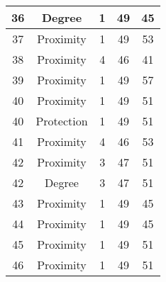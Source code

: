 \documentclass[results.tex]{subfiles}
\begin{document}
\begin{center}
\begin{tabular}{| c || c | c | c | c |}
            \hline
            36                      & Degree                       & 1                      & 49                      & 45                   \\
            \hline
            37                      & Proximity                    & 1                      & 49                      & 53                   \\
            \hline
            38                      & Proximity                    & 4                      & 46                      & 41                   \\
            \hline
            39                      & Proximity                    & 1                      & 49                      & 57                   \\
            \hline
            40                      & Proximity                    & 1                      & 49                      & 51                   \\
            \hline
            40                      & Protection                   & 1                      & 49                      & 51                   \\
            \hline
            41                      & Proximity                    & 4                      & 46                      & 53                   \\
            \hline
            42                      & Proximity                    & 3                      & 47                      & 51                   \\
            \hline
            42                      & Degree                       & 3                      & 47                      & 51                   \\
            \hline
            43                      & Proximity                    & 1                      & 49                      & 45                   \\
            \hline
            44                      & Proximity                    & 1                      & 49                      & 45                   \\
            \hline
            45                      & Proximity                    & 1                      & 49                      & 51                   \\
            \hline
            46                      & Proximity                    & 1                      & 49                      & 51                   \\

\end{tabular}
\end{center}
\end{document}

